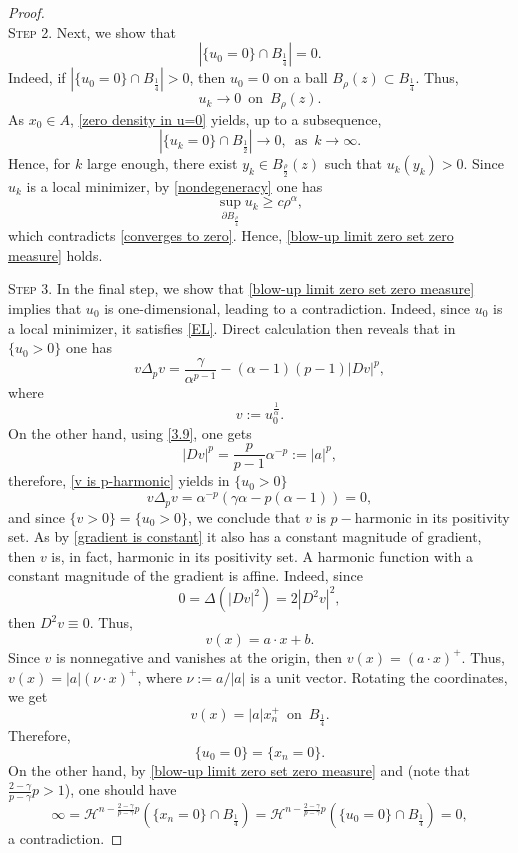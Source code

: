 \documentclass[11pt, reqno]{amsart}
\numberwithin{equation}{section}
\numberwithin{theorem}{section}
\numberwithin{lemma}{section}
\numberwithin{corollary}{section}
\numberwithin{remark}{section}
\numberwithin{proposition}{section}
\numberwithin{definition}{section}
\begin{document}
\begin{proof}
\begin{equation}
    \end{equation}
    \textsc{Step 2.} Next, we show that
    \begin{equation}\label{blow-up limit zero set zero measure}
        |\{u_0=0\}\cap B_{\frac{1}{4}}|=0.
    \end{equation} 
    Indeed, if $|\{u_0=0\}\cap B_{\frac{1}{4}}|>0$, then $u_0=0$ on a ball $B_\rho(z)\subset B_{\frac{1}{4}}$. Thus,
    \begin{equation}\label{converges to zero}
        u_k\to0\,\,\,\text{on}\,\,\,B_\rho(z).
    \end{equation}    
    As $x_0\in A$, \eqref{zero density in u=0} yields, up to a subsequence,
    $$
    |\{u_k=0\}\cap B_{\frac{1}{2}}|\to0,\,\,\,\text{as}\,\,\,k\to\infty.
    $$
    Hence, for $k$ large enough, there exist $y_k\in B_{\frac{\rho}{2}}(z)$ such that $u_k(y_k)>0$. Since $u_k$ is a local minimizer, by \eqref{nondegeneracy} one has
    $$
    \sup_{\partial B_{\frac{\rho}{4}}}u_k\ge c\rho^\alpha,
    $$
    which contradicts \eqref{converges to zero}. Hence, \eqref{blow-up limit zero set zero measure} holds.

    \textsc{Step 3.} In the final step, we show that \eqref{blow-up limit zero set zero measure} implies that $u_0$ is one-dimensional, leading to a contradiction. Indeed, since $u_0$ is a local minimizer, it satisfies \eqref{EL}. Direct calculation then reveals that in $\{u_0>0\}$ one has
    \begin{equation}\label{v is p-harmonic}
        v\Delta_pv=\frac{\gamma}{\alpha^{p-1}}-(\alpha-1)(p-1)|Dv|^p,
    \end{equation}
    where
    $$
    v:=u_0^{\frac{1}{\alpha}}.
    $$
    On the other hand, using \eqref{3.9}, one gets
    \begin{equation}\label{gradient is constant}
        |Dv|^p=\frac{p}{p-1}\alpha^{-p}:=|a|^p,
    \end{equation}
    therefore, \eqref{v is p-harmonic} yields in $\{u_0>0\}$
    $$
    v\Delta_pv=\alpha^{-p}(\gamma\alpha-p(\alpha-1))=0,
    $$
    and since $\{v>0\}=\{u_0>0\}$, we conclude that $v$ is $p-$harmonic in its positivity set. As by \eqref{gradient is constant} it also has a constant magnitude of gradient, then $v$ is, in fact, harmonic in its positivity set. A harmonic function with a constant magnitude of the gradient is affine. Indeed, since
    $$
    0=\Delta(|Dv|^2)=2|D^2v|^2,
    $$
    then $D^2v\equiv0$. Thus,
    $$
    v(x)=a\cdot x+b.
    $$
    Since $v$ is nonnegative and vanishes at the origin, then $v(x)=(a\cdot x)^+$. Thus, $v(x)=|a|(\nu\cdot x)^+$, where $\nu:=a/|a|$ is a unit vector. Rotating the coordinates, we get 
    $$
    v(x)=|a|x_n^+\,\,\,\text{on}\,\,\,B_{\frac{1}{4}}.
    $$
    Therefore,
    $$
    \{u_0=0\}=\{x_n=0\}.
    $$
    On the other hand, by \eqref{blow-up limit zero set zero measure} and  (note that $\frac{2-\gamma}{p-\gamma}p>1$),  one should have
    $$
    \infty=\mathcal{H}^{n-\frac{2-\gamma}{p-\gamma}p}\left(\{x_n=0\}\cap B_{\frac{1}{4}}\right)=\mathcal{H}^{n-\frac{2-\gamma}{p-\gamma}p}\left(\{u_0=0\}\cap B_{\frac{1}{4}}\right)=0,
    $$
    a contradiction.
\end{proof}
\end{document}
